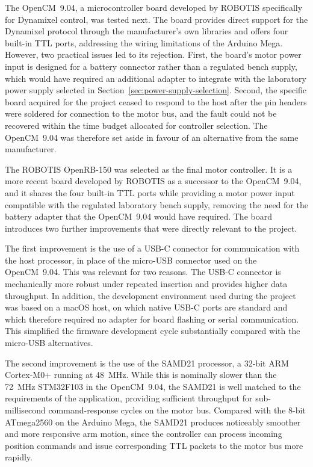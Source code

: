 The OpenCM~9.04, a microcontroller board developed by ROBOTIS 
specifically for Dynamixel control, was tested next. The board 
provides direct support for the Dynamixel protocol through the 
manufacturer's own libraries and offers four built-in TTL ports, 
addressing the wiring limitations of the Arduino Mega. However, 
two practical issues led to its rejection. First, the board's 
motor power input is designed for a battery connector rather 
than a regulated bench supply, which would have required an 
additional adapter to integrate with the laboratory power supply
selected in Section~\ref{sec:power-supply-selection}. Second, the specific board acquired
for the project ceased to respond to the host after the pin
headers were soldered for connection to the motor bus, and the 
fault could not be recovered within the time budget allocated 
for controller selection. The OpenCM~9.04 was therefore set 
aside in favour of an alternative from the same manufacturer.

The ROBOTIS OpenRB-150 was selected as the final motor controller. 
It is a more recent board developed by ROBOTIS as a successor to 
the OpenCM~9.04, and it shares the four built-in TTL ports while 
providing a motor power input compatible with the regulated 
laboratory bench supply, removing the need for the battery 
adapter that the OpenCM~9.04 would have required. The board 
introduces two further improvements that were directly relevant 
to the project.

The first improvement is the use of a USB-C connector for 
communication with the host processor, in place of the micro-USB 
connector used on the OpenCM~9.04. This was relevant for two 
reasons. The USB-C connector is mechanically more robust under 
repeated insertion and provides higher data throughput. In 
addition, the development environment used during the project 
was based on a macOS host, on which native USB-C ports are 
standard and which therefore required no adapter for board 
flashing or serial communication. This simplified the firmware 
development cycle substantially compared with the micro-USB 
alternatives.

The second improvement is the use of the SAMD21 processor, a 
32-bit ARM Cortex-M0+ running at 48~MHz. While this is nominally 
slower than the 72~MHz STM32F103 in the OpenCM~9.04, the SAMD21 
is well matched to the requirements of the application, providing 
sufficient throughput for sub-millisecond command-response cycles 
on the motor bus. Compared with the 8-bit ATmega2560 on the 
Arduino Mega, the SAMD21 produces noticeably smoother and more 
responsive arm motion, since the controller can process incoming 
position commands and issue corresponding TTL packets to the 
motor bus more rapidly.

